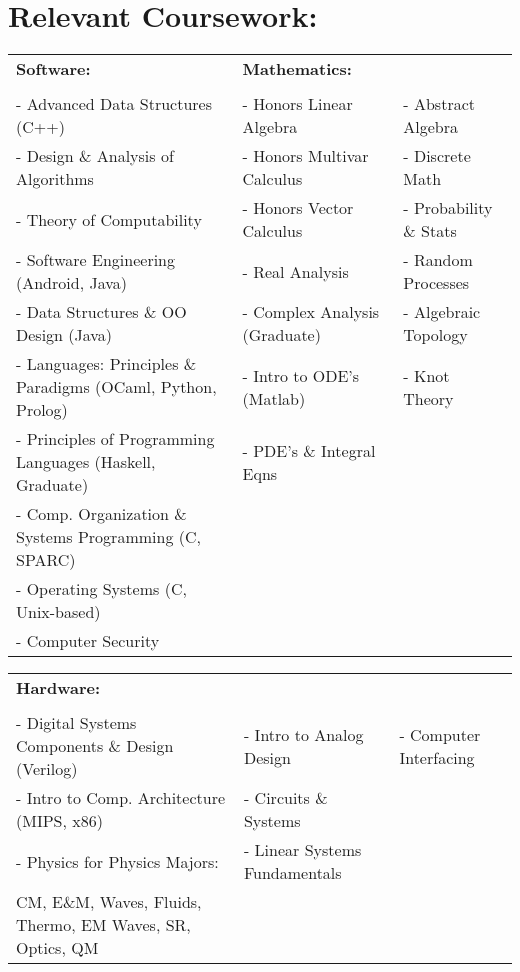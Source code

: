 \documentclass{article}
\begin{document}
\section*{Relevant Coursework:}
\begin{tabular}{l l l}
	\textbf{Software:}           & \textbf{Mathematics:} & \\
	\dotfill & \dotfill & \dotfill \\
	- Advanced Data Structures (C++)  & - Honors Linear Algebra        & - Abstract Algebra \\
	- Design \& Analysis of Algorithms & - Honors Multivar Calculus & - Discrete Math \\
	- Theory of Computability             & - Honors Vector Calculus & - Probability \& Stats   \\
	- Software Engineering (Android, Java) & - Real Analysis & - Random Processes \\
	- Data Structures \& OO Design (Java) & - Complex Analysis (Graduate) & - Algebraic Topology \\
	- Languages: Principles \& Paradigms (OCaml, Python, Prolog) & - Intro to ODE's (Matlab)  & - Knot Theory \\
	- Principles of Programming Languages (Haskell, Graduate) & - PDE's \& Integral Eqns \\
	- Comp. Organization \& Systems Programming  (C, SPARC) & \\
	- Operating Systems (C, Unix-based) \\
  - Computer Security
\end {tabular}

\begin{tabular}{l l l} \\
	\textbf{Hardware:} \\
	\dotfill & \dotfill & \dotfill \\
	- Digital Systems Components \& Design (Verilog) & - Intro to Analog Design & - Computer Interfacing\\
	- Intro to Comp. Architecture (MIPS, x86) & - Circuits \& Systems  \\
	- Physics for Physics Majors: & - Linear Systems Fundamentals \\
	\hspace{3pt} CM, E\&M, Waves, Fluids, Thermo, EM Waves, SR, Optics, QM \\
\end {tabular}
\end{document}
